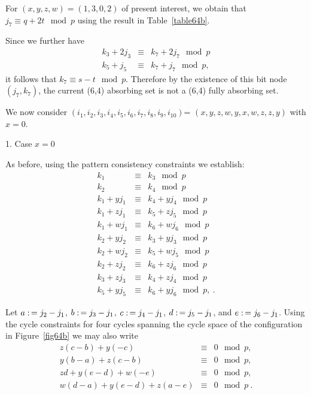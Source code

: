 For $(x,y,z,w)=(1,3,0,2)$ of present interest, we obtain that $j_7
\equiv q+2t \mod p$ using the result in Table~\ref{table64b}.

Since we further have
\begin{eqnarray*}
k_3+2j_3 &\equiv & k_7+2j_7 \mod p\\
k_5+j_5 & \equiv & k_7 +j_7 \mod p,
\end{eqnarray*}
it follows that $k_7 \equiv s-t \mod p$. Therefore by the existence
of this bit node $(j_7,k_7)$, the current (6,4) absorbing set is not
a (6,4) fully absorbing set.




 We now consider
$(i_1,i_2,i_3,i_4,i_5,i_6,i_7,i_8,i_9,i_{10})$=
$(x,y,z,w,y,x,w,z,z,y)$ with $x=0$. 

1. Case $x=0$

As before, using the pattern consistency constraints we establish:
\begin{equation}\label{eq11c}\begin{array}{cccc}
k_1 & \equiv & k_3 \mod p\\
k_2 & \equiv & k_4 \mod p\\
k_1+yj_1 & \equiv & k_4+yj_4 \mod p\\
k_1+zj_1 & \equiv & k_5+zj_5 \mod p\\
k_1+wj_1 & \equiv & k_6+wj_6 \mod p\\
k_2+yj_2 & \equiv & k_3+yj_3 \mod p\\
k_2+wj_2 & \equiv & k_5+wj_5 \mod p\\
k_2+zj_2 & \equiv & k_6+zj_6 \mod p\\
k_3+zj_3 & \equiv & k_4+zj_4 \mod p\\
k_5+yj_5 & \equiv & k_6+yj_6 \mod p,~.
\end{array}\end{equation}

Let $a \asn j_2 -j_1$, $b \asn j_3 -j_1$, $c \asn j_4 -j_1$, $d \asn
j_5 -j_1$, and $e \asn j_6 -j_1$. Using the cycle constraints for
four cycles spanning the cycle space of the configuration in
Figure~\ref{fig64b} we may also write
\begin{equation}\label{eq11d}\begin{array}{cccc}
z(c-b)+y(-c) &\equiv & 0 \mod p, \\
y(b-a)+z(c-b)&\equiv & 0 \mod p, \\
zd+y(e-d)+w(-e) &\equiv & 0 \mod p, \\
w(d-a)+y(e-d)+z(a-e) &\equiv & 0 \mod p~.
\end{array}\end{equation}


